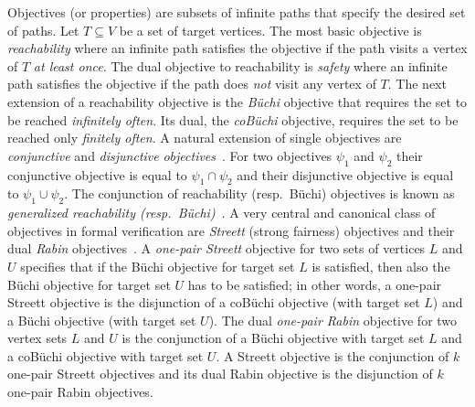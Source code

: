 \documentclass[11pt,letterpaper]{article}
\newcommand{\lu}{\textup{(}}
\newcommand{\ru}{\textup{)}\xspace}
\newcommand{\upbr}[1]{\lu #1\ru}
\newcommand{\obj}{\psi\xspace}
\newcommand{\target}{T\xspace}
\newif\iffullversion
\newcommand{\infull}[1]{\iffullversion #1\fi}
\newcommand{\inshort}[1]{\iffullversion \else #1\fi}
\begin{document}
\smallskip{}
Objectives (or properties) are subsets of infinite paths that specify the 
desired set of paths. \inshort{Let $\target \subseteq V$ be a set of target
vertices.}
The most basic objective is \emph{reachability} where\infull{, given a set 
$\target \subseteq V$ of \emph{target} vertices,} an infinite path satisfies the 
objective if the path visits a vertex of $\target$ {\em at least once}.
The dual objective to reachability is \emph{safety} where\infull{, given a set 
$\target \subseteq V$ of \emph{target} vertices,} an infinite path satisfies the 
objective if the path does \emph{not} visit any vertex of $\target$.
The next extension of a reachability objective is the 
\emph{Büchi} objective that requires the set\infull{ of target vertices} 
to be reached \emph{infinitely often}. Its dual, the \emph{coBüchi} objective, 
requires the set\infull{ of target vertices} to be reached only \emph{finitely often}.
A natural extension of single objectives are \emph{conjunctive} and \emph{disjunctive} 
\emph{objectives}~\cite{FijalkowH12,Wolper00,ChatterjeeHP07}. For two objectives
$\obj_1$ and $\obj_2$ their conjunctive objective is equal to $\obj_1 \cap \obj_2$
and their disjunctive objective is equal to $\obj_1 \cup \obj_2$.
The conjunction of reachability (resp.\ Büchi) objectives is known as 
\emph{generalized reachability \upbr{resp.\ Büchi}}~\cite{FijalkowH12,Wolper00}.
A very central and canonical class of objectives in formal verification are 
\emph{Streett} (strong fairness) objectives and their dual \emph{Rabin} objectives~\cite{Thomas97}.
A \emph{one-pair Streett} objective for two sets of vertices $L$ and $U$ specifies
that if the Büchi objective for target set $L$ is satisfied, then also the Büchi
objective for target set $U$ has to be satisfied; in other words, a one-pair 
Streett objective is the disjunction of a coBüchi objective (with target set 
$L$) and a Büchi objective (with target set $U$).
The dual \emph{one-pair Rabin} objective for two vertex sets $L$ and $U$ 
is the conjunction of a Büchi objective with target set $L$ and a
coBüchi objective with target set $U$.
A Streett objective is the conjunction of $k$ one-pair Streett objectives
and its dual Rabin objective is the disjunction of $k$ one-pair Rabin objectives.
\end{document}
